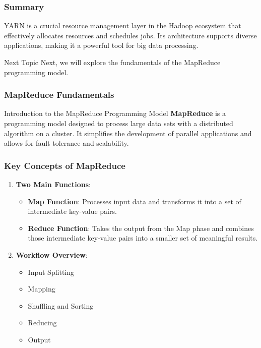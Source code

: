 \documentclass[aspectratio=169]{beamer}
\begin{document}
\begin{frame}[fragile]
    \frametitle{Summary}
    YARN is a crucial resource management layer in the Hadoop ecosystem that effectively allocates resources and schedules jobs. Its architecture supports diverse applications, making it a powerful tool for big data processing.

    \begin{block}{Next Topic}
        Next, we will explore the fundamentals of the MapReduce programming model.
    \end{block}
\end{frame}

\begin{frame}[fragile]
    \frametitle{MapReduce Fundamentals}
    \begin{block}{Introduction to the MapReduce Programming Model}
        \textbf{MapReduce} is a programming model designed to process large data sets with a distributed algorithm on a cluster. 
        It simplifies the development of parallel applications and allows for fault tolerance and scalability.
    \end{block}
\end{frame}

\begin{frame}[fragile]
    \frametitle{Key Concepts of MapReduce}
    \begin{enumerate}
        \item \textbf{Two Main Functions}:
        \begin{itemize}
            \item \textbf{Map Function}: Processes input data and transforms it into a set of intermediate key-value pairs.
            \item \textbf{Reduce Function}: Takes the output from the Map phase and combines those intermediate key-value pairs into a smaller set of meaningful results.
        \end{itemize}
        
        \item \textbf{Workflow Overview}:
        \begin{itemize}
            \item Input Splitting
            \item Mapping
            \item Shuffling and Sorting
            \item Reducing
            \item Output
        \end{itemize}
    \end{enumerate}
\end{frame}
\end{document}
